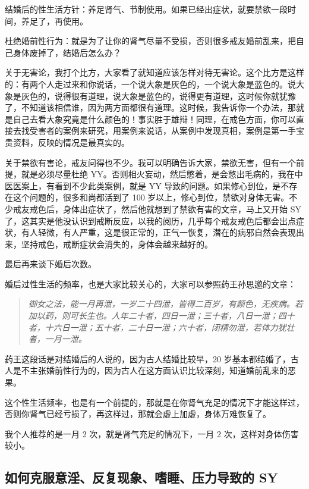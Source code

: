 \documentclass[fontset=founder]{ctexart}
\begin{document}
结婚后的性生活方针：养足肾气、节制使用。如果已经出症状，就要禁欲一段时间，养足了，再使用。

杜绝婚前性行为：就是为了让你的肾气尽量不受损，否则很多戒友婚前乱来，把自己身体废掉了，结婚后怎么办？

关于无害论，我打个比方，大家看了就知道应该怎样对待无害论。这个比方是这样的：有两个人走过来和你说话，一个说大象是灰色的，一个说大象是蓝色的。说大象是灰色的，说得很有道理，说大象是蓝色的，说得更有道理，这时候你就犹豫了，不知道该相信谁，因为两方面都很有道理。这时候，我告诉你一个办法，那就是自己去看大象究竟是什么颜色的！事实胜于雄辩！同理，在戒色方面，你可以直接去找受害者的案例来研究，用案例来说话，从案例中发现真相，案例是第一手宝贵资料，反映的情况是最真实的。

关于禁欲有害论，戒友问得也不少。我可以明确告诉大家，禁欲无害，但有一个前提，就是必须尽量杜绝 YY。否则相火妄动，然后憋着，是会憋出毛病的，我在中医医案上，有看到不少此类案例，就是 YY 导致的问题。如果修心到位，是不存在这个问题的，很多和尚都活到了 100 岁以上，修心到位，禁欲对身体无害。不少戒友戒色后，身体出症状了，然后他就想到了禁欲有害的文章，马上又开始 SY 了，这其实是他没认识到戒断反应，以我的阅历，几乎每个戒友戒色后都会出点症状，有人轻微，有人严重，这是很正常的，正气一恢复，潜在的病邪自然会表现出来，坚持戒色，戒断症状会消失的，身体会越来越好的。

最后再来谈下婚后次数。

婚后过性生活的频率，也是大家比较关心的，大家可以参照药王孙思邈的文章：

\begin{quote}\it
    御女之法，能一月再泄，一岁二十四泄，皆得二百岁，有颜色，无疾病。若加以药，则可长生也。人年二十者，四日一泄；三十者，八日一泄；四十者，十六日一泄；五十者，二十日一泄；六十者，闭精勿泄，若体力犹壮者，一月一泄。
\end{quote}

药王这段话是对结婚后的人说的，因为古人结婚比较早，20 岁基本都结婚了，古人是不主张婚前性行为的，因为古人在这方面认识比较深刻，知道婚前乱来的恶果。

这个性生活频率，也是有一个前提的，那就是在你肾气充足的情况下才能这样过，否则你肾气已经亏损了，再这样过，那就会虚上加虚，身体万难恢复了。

我个人推荐的是一月 2 次，就是肾气充足的情况下，一月 2 次，这样对身体伤害较小。

\subsection{如何克服意淫、反复现象、嗜睡、压力导致的 SY}
\end{document}
